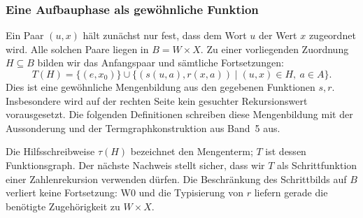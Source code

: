 \subsubsection{Eine Aufbauphase als gewöhnliche Funktion}

Ein Paar \((u,x)\) hält zunächst nur fest, dass dem Wort \(u\) der
Wert \(x\) zugeordnet wird. Alle solchen Paare liegen in
\(B=W\times X\). Zu einer vorliegenden Zuordnung \(H\subseteq B\)
bilden wir das Anfangspaar und sämtliche Fortsetzungen:
\[
  T(H)=\{(e,x_0)\}\cup
  \{(s(u,a),r(x,a))\mid (u,x)\in H,\ a\in A\}.
\]
Dies ist eine gewöhnliche Mengenbildung aus den gegebenen Funktionen
\(s,r\). Insbesondere wird auf der rechten Seite kein gesuchter
Rekursionswert vorausgesetzt. Die folgenden Definitionen schreiben diese
Mengenbildung mit der Aussonderung und der Termgraphkonstruktion aus
Band~5 aus.




Die Hilfsschreibweise \(\tau(H)\) bezeichnet den Mengenterm;
\(T\) ist dessen Funktionsgraph. Der nächste Nachweis stellt sicher,
dass wir \(T\) als Schrittfunktion einer Zahlenrekursion verwenden
dürfen. Die Beschränkung des Schrittbilds auf \(B\) verliert keine
Fortsetzung: W0 und die Typisierung von \(r\) liefern gerade die
benötigte Zugehörigkeit zu \(W\times X\).

